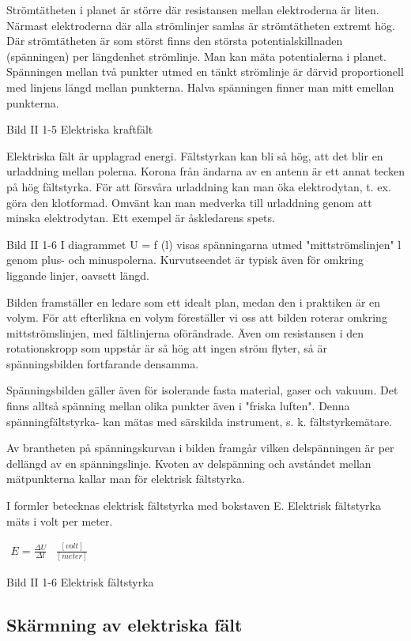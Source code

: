 Strömtätheten i planet är större där resistansen mellan elektroderna är liten. Närmast
elektroderna där alla strömlinjer samlas är strömtätheten extremt hög. Där strömtätheten
är som störst finns den största potentialskillnaden (spänningen) per längdenhet
strömlinje. Man kan mäta potentialerna i planet. Spänningen mellan två punkter utmed en
tänkt strömlinje är därvid proportionell med linjens längd mellan punkterna. Halva
spänningen finner man mitt emellan punkterna.

Bild II 1-5 Elektriska kraftfält

Elektriska fält är upplagrad energi. Fältstyrkan kan bli så hög, att det blir en
urladdning mellan polerna. Korona från ändarna av en antenn är ett annat tecken på hög
fältstyrka. För att försvåra urladdning kan man öka elektrodytan, t. ex. göra den
klotformad. Omvänt kan man medverka till urladdning genom att minska elektrodytan.
Ett exempel är åskledarens spets.

Bild II 1-6
I diagrammet U = f (l) visas spänningarna utmed "mittströmslinjen" l genom plus- och
minuspolerna. Kurvutseendet är typisk även för omkring liggande linjer, oavsett längd.

Bilden framställer en ledare som ett idealt plan, medan den i praktiken är en volym.
För att efterlikna en volym föreställer vi oss att bilden roterar omkring
mittströmslinjen, med fältlinjerna oförändrade. Även om resistansen i den rotationskropp
som uppstår är så hög att ingen ström flyter, så är spänningsbilden fortfarande densamma.

Spänningsbilden gäller även för isolerande fasta material, gaser och vakuum.
Det finns alltså spänning mellan olika punkter även i "friska luften". Denna
spänningfältstyrka- kan mätas med särskilda instrument, s. k. fältstyrkemätare.

Av brantheten på spänningskurvan i bilden framgår vilken delspänningen är per dellängd av
en spänningslinje. Kvoten av delspänning och avståndet mellan mätpunkterna kallar man för
elektrisk fältstyrka.

I formler betecknas elektrisk fältstyrka med bokstaven E.
Elektrisk fältstyrka mäts i volt per meter.

$
\begin{array}{cc}
E=\frac{\Delta U}{\Delta l} & \frac{[volt]}{[meter]}
\end{array}
$

Bild II 1-6 Elektrisk fältstyrka

\subsection{Skärmning av elektriska fält}

